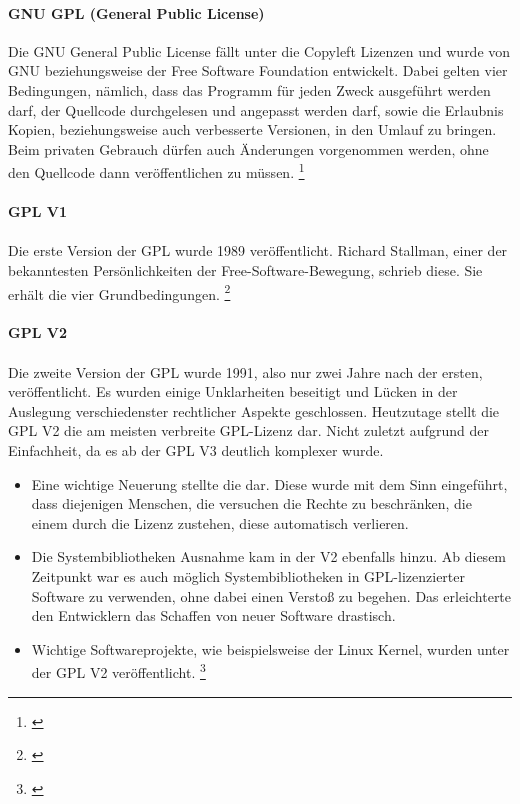 \documentclass[titlepage,12pt,twoside]{article}
\begin{document}
\paragraph{GNU GPL (General Public License)}
\hfill \break
\hfill \break
Die GNU General Public License fällt unter die Copyleft Lizenzen und wurde von GNU beziehungsweise der Free 
Software Foundation entwickelt. Dabei gelten vier Bedingungen, nämlich, dass das Programm für jeden Zweck 
ausgeführt werden darf, der Quellcode durchgelesen und angepasst werden darf, sowie die Erlaubnis Kopien, 
beziehungsweise auch verbesserte Versionen, in den Umlauf zu bringen. Beim privaten Gebrauch dürfen auch 
Änderungen vorgenommen werden, ohne den Quellcode dann veröffentlichen zu müssen. \footnote{\cite{WikipediaGPL}} \\
\\
\textbf{GPL V1} \\
\\
Die erste Version der GPL wurde 1989 veröffentlicht. Richard Stallman, einer der bekanntesten 
Persönlichkeiten der Free-Software-Bewegung, schrieb diese. Sie erhält die vier Grundbedingungen. \footnote{\cite{WikipediaGPL3}} \\
\\
\textbf{GPL V2} \\
\\
Die zweite Version der GPL wurde 1991, also nur zwei Jahre nach der ersten, veröffentlicht. Es wurden einige 
Unklarheiten beseitigt und Lücken in der Auslegung verschiedenster rechtlicher Aspekte geschlossen. 
Heutzutage stellt die GPL V2 die am meisten verbreite GPL-Lizenz dar. Nicht zuletzt aufgrund der Einfachheit, 
da es ab der GPL V3 deutlich komplexer wurde. \\
\begin{itemize}
	\item Eine wichtige Neuerung stellte die  dar. Diese wurde mit dem Sinn 
	eingeführt, dass diejenigen Menschen, die versuchen die Rechte zu beschränken, die einem durch die 
	Lizenz zustehen, diese automatisch verlieren.
	\item Die Systembibliotheken Ausnahme kam in der V2 ebenfalls hinzu. Ab diesem Zeitpunkt war es auch 
	möglich Systembibliotheken in GPL-lizenzierter Software zu verwenden, ohne dabei einen Verstoß zu begehen. 
	Das erleichterte den Entwicklern das Schaffen von neuer Software drastisch.
	\item Wichtige Softwareprojekte, wie beispielsweise der Linux Kernel, wurden unter der GPL V2 
	veröffentlicht. \footnote{\cite{WikipediaGPL3}}
\end{itemize}
\end{document}
